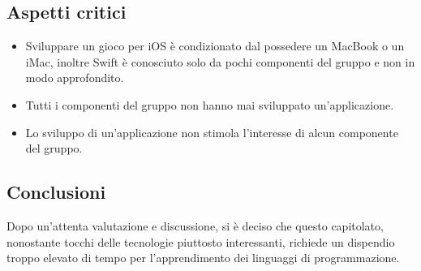  \subsection{Aspetti critici}
\begin{itemize}
	\item Sviluppare un gioco per iOS è condizionato dal possedere un MacBook o un iMac, inoltre Swift è conosciuto solo da pochi componenti del gruppo e non in modo approfondito.
	\item Tutti i componenti del gruppo non hanno mai sviluppato un'applicazione.
	\item Lo sviluppo di un'applicazione non stimola l'interesse di alcun componente del gruppo.
\end{itemize}

\subsection{Conclusioni}
Dopo un'attenta valutazione e discussione, si è deciso che questo capitolato, nonostante tocchi delle tecnologie piuttosto interessanti, richiede un dispendio troppo elevato di tempo per l'apprendimento dei linguaggi di programmazione.
